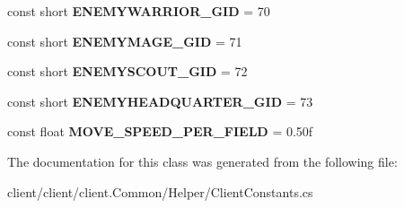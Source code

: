 \begin{DoxyCompactItemize}
\item 
\hypertarget{classClient_1_1Common_1_1Helper_1_1ClientConstants_ae13276dfe5ecc275830b4f76d13abaee}{const short {\bfseries E\-N\-E\-M\-Y\-W\-A\-R\-R\-I\-O\-R\-\_\-\-G\-I\-D} = 70}\label{classClient_1_1Common_1_1Helper_1_1ClientConstants_ae13276dfe5ecc275830b4f76d13abaee}

\item 
\hypertarget{classClient_1_1Common_1_1Helper_1_1ClientConstants_aa775021a32e91dfe6ad6f13d8d73aa39}{const short {\bfseries E\-N\-E\-M\-Y\-M\-A\-G\-E\-\_\-\-G\-I\-D} = 71}\label{classClient_1_1Common_1_1Helper_1_1ClientConstants_aa775021a32e91dfe6ad6f13d8d73aa39}

\item 
\hypertarget{classClient_1_1Common_1_1Helper_1_1ClientConstants_aa0ce238057517437ddbbcb7cb01d4189}{const short {\bfseries E\-N\-E\-M\-Y\-S\-C\-O\-U\-T\-\_\-\-G\-I\-D} = 72}\label{classClient_1_1Common_1_1Helper_1_1ClientConstants_aa0ce238057517437ddbbcb7cb01d4189}

\item 
\hypertarget{classClient_1_1Common_1_1Helper_1_1ClientConstants_a0e987dc23b11c98a74cbb4e70ec0ff9f}{const short {\bfseries E\-N\-E\-M\-Y\-H\-E\-A\-D\-Q\-U\-A\-R\-T\-E\-R\-\_\-\-G\-I\-D} = 73}\label{classClient_1_1Common_1_1Helper_1_1ClientConstants_a0e987dc23b11c98a74cbb4e70ec0ff9f}

\item 
\hypertarget{classClient_1_1Common_1_1Helper_1_1ClientConstants_a4c78950badd3e066c26f227d61daf21e}{const float {\bfseries M\-O\-V\-E\-\_\-\-S\-P\-E\-E\-D\-\_\-\-P\-E\-R\-\_\-\-F\-I\-E\-L\-D} = 0.\-50f}\label{classClient_1_1Common_1_1Helper_1_1ClientConstants_a4c78950badd3e066c26f227d61daf21e}

\end{DoxyCompactItemize}


The documentation for this class was generated from the following file\-:\begin{DoxyCompactItemize}
\item 
client/client/client.\-Common/\-Helper/Client\-Constants.\-cs\end{DoxyCompactItemize}
